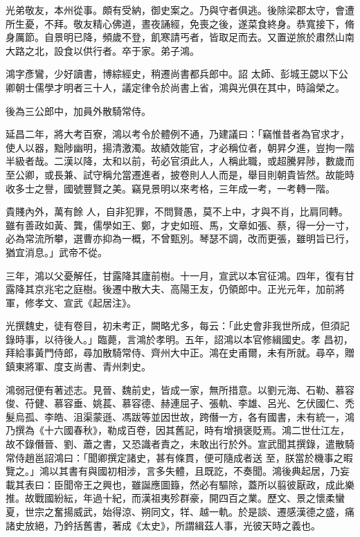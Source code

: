 \begin{pinyinscope}
 光弟敬友，本州從事。頗有受納，御史案之。乃與守者俱逃。後除梁郡太守，會遭所生憂，不拜。敬友精心佛道，晝夜誦經，免喪之後，遂菜食終身。恭寬接下，脩身厲節。自景明已降，頻歲不登，飢寒請丐者，皆取足而去。又置逆旅於肅然山南大路之北，設食以供行者。卒于家。弟子鴻。



 鴻字彥鸞，少好讀書，博綜經史，稍遷尚書都兵郎中。詔
 太師、彭城王勰以下公卿朝士儒學才明者三十人，議定律令於尚書上省，鴻與光俱在其中，時論榮之。



 後為三公郎中，加員外散騎常侍。



 延昌二年，將大考百寮，鴻以考令於體例不通，乃建議曰：「竊惟昔者為官求才，使人以器，黜陟幽明，揚清激濁。故績效能官，才必稱位者，朝昇夕進，豈拘一階半級者哉。二漢以降，太和以前，茍必官須此人，人稱此職，或超騰昇陟，數歲而至公卿，或長兼、試守稱允當遷進者，披卷則人人而是，舉目則朝貴皆然。故能時收多士之譽，國號豐賢之美。竊見景明以來考格，三年成一考，一考轉一階。



 貴賤內外，萬有餘
 人，自非犯罪，不問賢愚，莫不上中，才與不肖，比肩同轉。雖有善政如黃、龔，儒學如王、鄭，才史如班、馬，文章如張、蔡，得一分一寸，必為常流所攀，選曹亦抑為一概，不曾甄別。琴瑟不調，改而更張，雖明旨已行，猶宜消息。」武帝不從。



 三年，鴻以父憂解任，甘露降其廬前樹。十一月，宣武以本官征鴻。四年，復有甘露降其京兆宅之庭樹。後遷中散大夫、高陽王友，仍領郎中。正光元年，加前將軍，修孝文、宣武《起居注》。



 光撰魏史，徒有卷目，初未考正，闕略尤多，每云：「此史會非我世所成，但須記錄時事，以待後人。」臨薨，言鴻於孝明。五年，詔鴻以本官修緝國史。孝
 昌初，拜給事黃門侍郎，尋加散騎常侍、齊州大中正。鴻在史甫爾，未有所就。尋卒，贈鎮東將軍、度支尚書、青州刺史。



 鴻弱冠便有著述志。見晉、魏前史，皆成一家，無所措意。以劉元海、石勒、慕容俊、苻健、慕容垂、姚萇、慕容德、赫連屈孑、張軌、李雄、呂光、乞伏國仁、禿髮烏孤、李皓、沮渠蒙遜、馮跋等並因世故，跨僭一方，各有國書，未有統一，鴻乃撰為《十六國春秋》，勒成百卷，因其舊記，時有增損褒貶焉。鴻二世仕江左，故不錄僭晉、劉、蕭之書，又恐識者責之，未敢出行於外。宣武聞其撰錄，遣散騎常侍趙邕詔鴻曰：「聞卿撰定諸史，甚有條貫，便可隨成者送
 至，朕當於機事之暇覽之。」鴻以其書有與國初相涉，言多失體，且既訖，不奏聞。鴻後典起居，乃妄載其表曰：臣聞帝王之興也，雖誕應圖籙，然必有驅除，蓋所以翦彼厭政，成此樂推。故戰國紛紜，年過十紀，而漢祖夷殄群豪，開四百之業。歷文、景之懷柔蠻夏，世宗之奮揚威武，始得涼、朔同文，䍧、越一軌。於是談、遷感漢德之盛，痛諸史放絕，乃鈐括舊書，著成《太史》，所謂緝茲人事，光彼天時之義也。




\end{pinyinscope}
